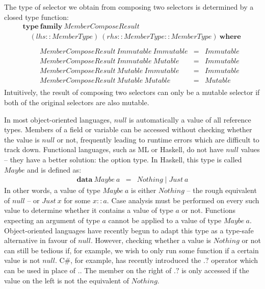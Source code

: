The type of selector we obtain from composing two selectors is determined by a closed type function:
\begin{displaymath}
\begin{array}{l}
\mathbf{type}~\mathbf{family}~\mathit{MemberComposeResult} \\
\quad (\mathit{lhs} :: \mathit{MemberType})~(\mathit{rhs} :: \mathit{MemberType} :: \mathit{MemberType})~\mathbf{where} \\\\
\qquad \begin{array}{lcl}
\mathit{MemberComposeResult}~\mathit{Immutable}~\mathit{Immutable} & = & \mathit{Immutable} \\
\mathit{MemberComposeResult}~\mathit{Immutable}~\mathit{Mutable} & = & \mathit{Immutable} \\
\mathit{MemberComposeResult}~\mathit{Mutable}~\mathit{Immutable} & = & \mathit{Immutable} \\
\mathit{MemberComposeResult}~\mathit{Mutable}~\mathit{Mutable} & = & \mathit{Mutable} 
\end{array}
\end{array}
\end{displaymath}
Intuitively, the result of composing two selectors can only be a mutable selector if both of the original selectors are also mutable. 

In most object-oriented languages, $\mathit{null}$ is automatically a value of all reference types. Members of a field or variable can be accessed without checking whether the value is $\mathit{null}$ or not, frequently leading to runtime errors which are difficult to track down. Functional languages, such as ML or Haskell, do not have $\mathit{null}$ values -- they have a better solution: the option type. In Haskell, this type is called $\mathit{Maybe}$ and is defined as:
\begin{displaymath}
\begin{array}{lcl}
\mathbf{data}~\mathit{Maybe}~a & = & \mathit{Nothing} \mid \mathit{Just}~a
\end{array}
\end{displaymath}
In other words, a value of type $\mathit{Maybe}~a$ is either $\mathit{Nothing}$ -- the rough equivalent of $\mathit{null}$ -- or $\mathit{Just}~x$ for some $x :: a$. Case analysis must be performed on every such value to determine whether it contains a value of type $a$ or not. Functions expecting an argument of type $a$ cannot be applied to a value of type $\mathit{Maybe}~a$. Object-oriented languages have recently begun to adapt this type as a type-safe alternative in favour of $\mathit{null}$. However, checking whether a value is $\mathit{Nothing}$ or not can still be tedious if, for example, we wish to only run some function if a certain value is not $\mathit{null}$. C\#, for example, has recently introduced the $.?$ operator which can be used in place of $.$. The member on the right of $.?$ is only accessed if the value on the left is not the equivalent of $\mathit{Nothing}$.

